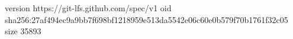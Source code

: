 version https://git-lfs.github.com/spec/v1
oid sha256:27af494ec9a9bb7f698bf1218959e513da5542e06c60e0b579f70b1761f32c05
size 35893
